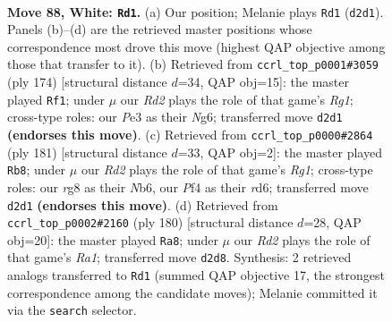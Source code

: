 \documentclass[11pt]{article}
\begin{document}
\clearpage

\begin{figure}[p]\centering
\begin{subfigure}{0.46\textwidth}\centering
\resizebox{\linewidth}{!}{%
\newchessgame
\chessboard[
  setfen={6r1/8/p3k3/Ppp2p1p/2p2P1P/4P1P1/1P1R1K2/8 w - - 21 88},
  showmover=false,
  pgfstyle=straightmove, color=movearrow, markmove={d2-d1}
]}
\caption{}
\end{subfigure}\hfill
\begin{subfigure}{0.46\textwidth}\centering
\resizebox{\linewidth}{!}{%
\newchessgame
\chessboard[
  setfen={6k1/6p1/6Np/p1p4P/PpP1r1P1/1P1pp3/8/2K3R1 w - - 2 88},
  showmover=false,
  pgfstyle=straightmove, color=movearrow, markmove={g1-f1}
]}
\caption{}
\end{subfigure}
\\[4pt]
\begin{subfigure}{0.46\textwidth}\centering
\resizebox{\linewidth}{!}{%
\newchessgame
\chessboard[
  setfen={6r1/5p1k/1n1Rp1pP/1p2P1B1/pP6/P7/2P5/1K6 b - - 2 91},
  showmover=false,
  pgfstyle=straightmove, color=movearrow, markmove={g8-b8}
]}
\caption{}
\end{subfigure}\hfill
\begin{subfigure}{0.46\textwidth}\centering
\resizebox{\linewidth}{!}{%
\newchessgame
\chessboard[
  setfen={8/5pk1/4p3/3p1p1p/3P3P/4P1P1/1r3P2/R4K2 w - - 5 91},
  showmover=false,
  pgfstyle=straightmove, color=movearrow, markmove={a1-a8}
]}
\caption{}
\end{subfigure}
\caption{\textbf{Move 88, White: \texttt{Rd1}.} (a) Our position; Melanie plays \texttt{Rd1} (\texttt{d2d1}). Panels (b)--(d) are the retrieved master positions whose correspondence most drove this move (highest QAP objective among those that transfer to it). (b) Retrieved from \texttt{ccrl\_top\_p0001\#3059} (ply 174) [structural distance $d$=34, QAP obj=15]: the master played \texttt{Rf1}; under $\mu$ our \emph{Rd2} plays the role of that game's \emph{Rg1}; cross-type roles: our \emph{P}e3 as their \emph{N}g6; transferred move \texttt{d2d1} \textbf{(endorses this move)}. (c) Retrieved from \texttt{ccrl\_top\_p0000\#2864} (ply 181) [structural distance $d$=33, QAP obj=2]: the master played \texttt{Rb8}; under $\mu$ our \emph{Rd2} plays the role of that game's \emph{Rg1}; cross-type roles: our \emph{r}g8 as their \emph{N}b6, our \emph{P}f4 as their \emph{r}d6; transferred move \texttt{d2d1} \textbf{(endorses this move)}. (d) Retrieved from \texttt{ccrl\_top\_p0002\#2160} (ply 180) [structural distance $d$=28, QAP obj=20]: the master played \texttt{Ra8}; under $\mu$ our \emph{Rd2} plays the role of that game's \emph{Ra1}; transferred move \texttt{d2d8}. Synthesis: 2 retrieved analogs transferred to \texttt{Rd1} (summed QAP objective 17, the strongest correspondence among the candidate moves); Melanie committed it via the \texttt{search} selector.}
\label{fig:thought-m174}
\end{figure}
\end{document}
